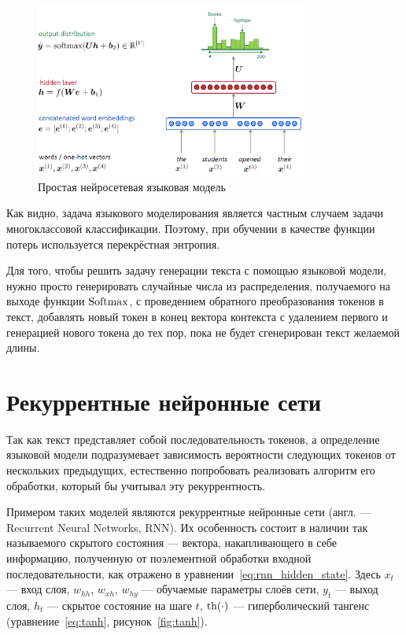 \begin{figure}[h]
    \centering
    \includegraphics[width=0.8\textwidth]{../inc/images/language_model.png}
    \caption{Простая нейросетевая языковая модель}
    \label{fig:lang_model}
\end{figure}

Как видно, задача языкового моделирования является частным случаем задачи многоклассовой классификации. Поэтому, при обучении в качестве функции потерь используется перекрёстная энтропия.

Для того, чтобы решить задачу генерации текста с помощью языковой модели, нужно просто генерировать случайные числа из распределения, получаемого на выходе функции $\operatorname{Softmax}$, с проведением обратного преобразования токенов в текст, добавлять новый токен в конец вектора контекста с удалением первого и генерацией нового токена до тех пор, пока не будет сгенерирован текст желаемой длины.

\section{Рекуррентные нейронные сети}

Так как текст представляет собой последовательность токенов, а определение языковой модели подразумевает зависимость вероятности следующих токенов от нескольких предыдущих, естественно попробовать реализовать алгоритм его обработки, который бы учитывал эту рекуррентность.

Примером таких моделей являются рекуррентные нейронные сети (англ. --- Recurrent Neural Networks, RNN). Их особенность состоит в наличии так называемого скрытого состояния --- вектора, накапливающего в себе информацию, полученную от поэлементной обработки входной последовательности, как отражено в уравнении \ref*{eq:rnn_hidden_state}. Здесь $x_t$ --- вход слоя, $w_{hh}$, $w_{xh}$, $w_{hy}$ --- обучаемые параметры слоёв сети, $y_t$ --- выход слоя, $h_t$ --- скрытое состояние на шаге $t$, $\operatorname{th}(\cdot)$ --- гиперболический тангенс (уравнение \ref*{eq:tanh}, рисунок \ref*{fig:tanh}).

